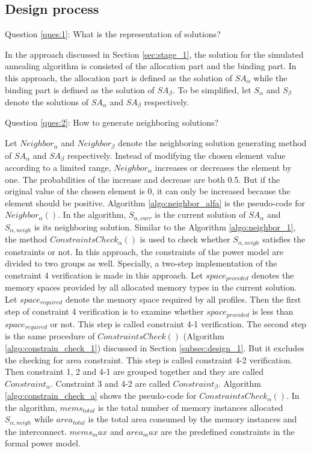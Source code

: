		\subsection{Design process}
		\label{subsec:design_2}
		Question \ref{ques:1}: What is the representation of solutions?
		
		In the approach discussed in Section \ref{sec:stage_1}, the solution for the
		simulated annealing algorithm is consisted of the allocation part and the
		binding part. In this approach, the allocation part is defined as the
		solution of $SA_{\alpha}$ while the binding part is defined as the solution
		of $SA_{\beta}$. To be simplified, let $S_{\alpha}$ and $S_{\beta}$ denote
		the solutions of $SA_{\alpha}$ and $SA_{\beta}$ respectively.
		
		Question \ref{ques:2}: How to generate neighboring solutions?
		
		Let $Neighbor_{\alpha}$ and $Neighbor_{\beta}$ denote the neighboring
		solution generating method of $SA_{\alpha}$ and $SA_{\beta}$ respectively.
		Instead of modifying the chosen element value according to a limited range,
		$Neighbor_{\alpha}$ increases or decreases the element by one. 
		The probabilities of the increase and decrease are both 0.5.
		But if the original value of the chosen element is 0, it can only be
		increased because the element should be positive.
		Algorithm \ref{algo:neighbor_alfa} is the pseudo-code for $Neighbor_{\alpha}()$.
		In the algorithm, $S_{\alpha,curr}$ is the current solution of
		$SA_{\alpha}$ and $S_{\alpha,neigh}$ is its neighboring solution.
		Similar to the Algorithm \ref{algo:neighbor_1}, the method $ConstraintsCheck_{\alpha}()$ is used to check whether $S_{\alpha,neigh}$
		satisfies the constraints or not.
		In this approach, the constraints of the power model are divided to two
		groups as well.
		Specially, a two-step implementation of the constraint 4 verification
		is made in this approach.
		Let $space_{provided}$ denotes the memory spaces provided by all allocated
		memory types in the current solution.
		Let $space_{required}$ denote the memory space required by all profiles.
		Then the first step of constraint 4 verification is to examine whether
		$space_{provided}$ is less than $space_{required}$ or not. This step is
		called constraint 4-1 verification.
		The second step is the same procedure of $ConstraintsCheck()$
		(Algorithm \ref{algo:constrain_check_1}) discussed in Section \ref{subsec:design_1}.
		But it excludes the checking for area constraint. This step is called
		constraint 4-2 verification.
		Then constraint 1, 2 and 4-1 are grouped together and they are called $Constraint_{\alpha}$.
		Constraint 3 and 4-2 are called $Constraint_{\beta}$.
		Algorithm \ref{algo:constrain_check_a} shows the pseudo-code for $ConstraintsCheck_{\alpha}()$.
		In the algorithm, $mems_{total}$ is the total number of memory instances allocated
		$S_{\alpha,neigh}$ while $area_{total}$ is the total area consumed by the memory
		instances and the interconnect.
		$mems_max$ and $area_max$ are the predefined constraints in
		the formal power model.
		
		
	
